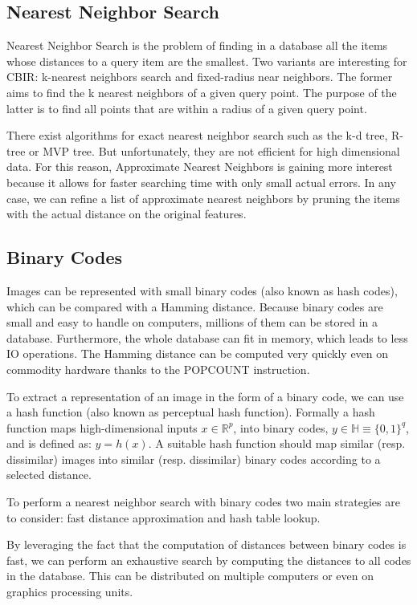 \subsection{Nearest Neighbor Search}
Nearest Neighbor Search is the problem of finding in a database all the items whose distances to a query item are the smallest. Two variants are interesting for CBIR: k-nearest neighbors search and fixed-radius near neighbors. The former aims to find the k nearest neighbors of a given query point. The purpose of the latter is to find all points that are within a radius of a given query point.

There exist algorithms for exact nearest neighbor search such as the k-d tree, R-tree or MVP tree. But unfortunately, they are not efficient for high dimensional data. For this reason, Approximate Nearest Neighbors is gaining more interest because it allows for faster searching time with only small actual errors. In any case, we can refine a list of approximate nearest neighbors by pruning the items with the actual distance on the original features.

\subsection{Binary Codes}
Images can be represented with small binary codes (also known as hash codes), which can be compared with a Hamming distance. Because binary codes are small and easy to handle on computers, millions of them can be stored in a database. Furthermore, the whole database can fit in memory, which leads to less IO operations. The Hamming distance can be computed very quickly even on commodity hardware thanks to the POPCOUNT instruction.

To extract a representation of an image in the form of a binary code, we can use a hash function (also known as perceptual hash function). Formally a hash function maps high-dimensional inputs $x\in\mathbb{R}^{p}$, into binary codes, $y\in\mathbb{H}\equiv\{0, 1\}^{q}$, and is defined as: $y=h(x)$. A suitable hash function should map similar (resp. dissimilar) images into similar (resp. dissimilar) binary codes according to a selected distance.

To perform a nearest neighbor search with binary codes two main strategies are to consider: fast distance approximation and hash table lookup.

By leveraging the fact that the computation of distances between binary codes is fast, we can perform an exhaustive search by computing the distances to all codes in the database. This can be distributed on multiple computers or even on graphics processing units.

